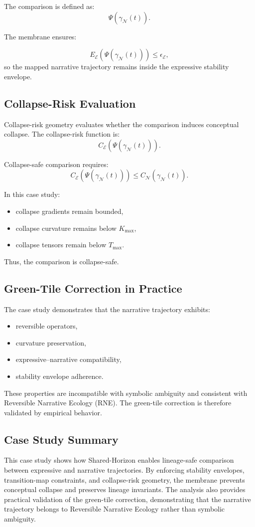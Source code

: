 The comparison is defined as:
\[
\Psi(\gamma_{\mathcal{N}}(t)).
\]

The membrane ensures:

\[
E_{\mathcal{E}}(\Psi(\gamma_{\mathcal{N}}(t))) \le \epsilon_{\mathcal{E}},
\]
so the mapped narrative trajectory remains inside the expressive stability
envelope.

\subsection{Collapse-Risk Evaluation}

Collapse-risk geometry evaluates whether the comparison induces conceptual
collapse. The collapse-risk function is:
\[
C_{\mathcal{E}}(\Psi(\gamma_{\mathcal{N}}(t))).
\]

Collapse-safe comparison requires:
\[
C_{\mathcal{E}}(\Psi(\gamma_{\mathcal{N}}(t))) \le C_{\mathcal{N}}(\gamma_{\mathcal{N}}(t)).
\]

In this case study:

\begin{itemize}
    \item collapse gradients remain bounded,
    \item collapse curvature remains below $K_{\max}$,
    \item collapse tensors remain below $T_{\max}$.
\end{itemize}

Thus, the comparison is collapse-safe.

\subsection{Green-Tile Correction in Practice}

The case study demonstrates that the narrative trajectory exhibits:

\begin{itemize}
    \item reversible operators,
    \item curvature preservation,
    \item expressive–narrative compatibility,
    \item stability envelope adherence.
\end{itemize}

These properties are incompatible with symbolic ambiguity and consistent with
Reversible Narrative Ecology (RNE). The green-tile correction is therefore
validated by empirical behavior.

\subsection{Case Study Summary}

This case study shows how Shared-Horizon enables lineage-safe comparison between
expressive and narrative trajectories. By enforcing stability envelopes,
transition-map constraints, and collapse-risk geometry, the membrane prevents
conceptual collapse and preserves lineage invariants. The analysis also provides
practical validation of the green-tile correction, demonstrating that the
narrative trajectory belongs to Reversible Narrative Ecology rather than
symbolic ambiguity.
